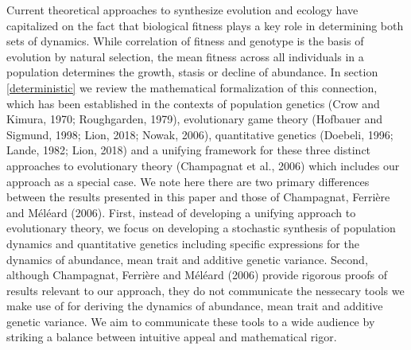 \documentclass[]{elsarticle} %
\begin{document}
Current theoretical approaches to synthesize evolution and ecology have
capitalized on the fact that biological fitness plays a key role in
determining both sets of dynamics. While correlation of fitness and
genotype is the basis of evolution by natural selection, the mean
fitness across all individuals in a population determines the growth,
stasis or decline of abundance. In section \ref{deterministic} we review
the mathematical formalization of this connection, which has been
established in the contexts of population genetics (Crow and Kimura,
1970; Roughgarden, 1979), evolutionary game theory (Hofbauer and
Sigmund, 1998; Lion, 2018; Nowak, 2006), quantitative genetics (Doebeli,
1996; Lande, 1982; Lion, 2018) and a unifying framework for these three
distinct approaches to evolutionary theory (Champagnat et al., 2006)
which includes our approach as a special case. We note here there are
two primary differences between the results presented in this paper and
those of Champagnat, Ferrière and Méléard (2006). First, instead of
developing a unifying approach to evolutionary theory, we focus on
developing a stochastic synthesis of population dynamics and
quantitative genetics including specific expressions for the dynamics of
abundance, mean trait and additive genetic variance. Second, although
Champagnat, Ferrière and Méléard (2006) provide rigorous proofs of
results relevant to our approach, they do not communicate the nessecary
tools we make use of for deriving the dynamics of abundance, mean trait
and additive genetic variance. We aim to communicate these tools to a
wide audience by striking a balance between intuitive appeal and
mathematical rigor.
\end{document}
